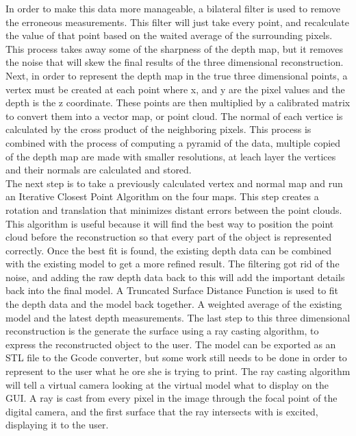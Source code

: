 \documentclass[12pt,twocolumn]{article}
\begin{document}
\indent In order to make this data more manageable, a bilateral filter is used to remove the erroneous measurements. This filter will just take every point, and recalculate the value of that point based on the waited average of the surrounding pixels. This process takes away some of the sharpness of the depth map, but it removes the noise that will skew the final results of the three dimensional reconstruction. Next, in order to represent the depth map in the true three dimensional points, a vertex must be created at each point where x, and y are the pixel values and the depth is the z coordinate. These points are then multiplied by a calibrated matrix to convert them into a vector map, or point cloud. The normal of each vertice is calculated by the cross product of the neighboring pixels. This process is combined with the process of computing a pyramid of the data, multiple copied of the depth map are made with smaller resolutions, at leach layer the vertices and their normals are calculated and stored. \\

\indent The next step is to take a previously calculated vertex and normal map and run an Iterative Closest Point Algorithm on the four maps. This step creates a rotation and translation that minimizes distant errors between the point clouds. This algorithm is useful because it will find the best way to position the point cloud before the reconstruction so that every part of the object is represented correctly. Once the best fit is found, the existing depth data can be combined with the existing model to get a more refined result. The filtering got rid of the noise, and adding the raw depth data back to this will add the important details back into the final model. A Truncated Surface Distance Function is used to fit the depth data and the model back together. A weighted average of the existing model and the latest depth measurements. The last step to this three dimensional reconstruction is the generate the surface using a ray casting algorithm, to express the reconstructed object to the user. The model can be exported as an STL file to the Gcode converter, but some work still needs to be done in order to represent to the user what he ore she is trying to print. The ray casting algorithm will tell a virtual camera looking at the virtual model what to display on the GUI. A ray is cast from every pixel in the image through the focal point of the digital camera, and the first surface that the ray intersects with is excited, displaying it to the user. \\
\end{document}
